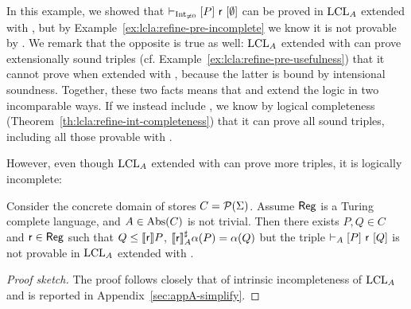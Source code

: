 In this example, we showed that $\vdash_{\text{Int}_{\neq 0}}\nobreak[P]~\mathsf{r}~[\emptyset]$ can be proved in $\text{LCL}_A$ extended with , but by Example~\ref{ex:lcla:refine-pre-incomplete} we know it is not provable by . We remark that the opposite is true as well: $\text{LCL}_A$ extended with  can prove extensionally sound triples (cf. Example~\ref{ex:lcla:refine-pre-usefulness}) that it cannot prove when extended with , because the latter is bound by intensional soundness. Together, these two facts means that  and  extend the logic in two incomparable ways. If we instead include , we know by logical completeness (Theorem~\ref{th:lcla:refine-int-completeness}) that it can prove all sound triples, including all those provable with .

However, even though $\text{LCL}_A$ extended with  can prove more triples, it is logically incomplete:

\begin{theorem}\label{th:lcla:intrinsic-incompl-simplify}
	Consider the concrete domain of stores $C = \mathcal{P}(\Sigma)$. Assume $\mathsf{Reg}$ is a Turing complete language, and $A \in \text{\normalfont Abs}(C)$ is not trivial. Then there exists $P, Q \in C$ and $\mathsf{r} \in \mathsf{Reg}$ such that $Q \le \llbracket\mathsf{r}\rrbracket P$, $\llbracket\mathsf{r}\rrbracket^{\sharp}_A \alpha(P) = \alpha(Q)$ but the triple $\vdash_{A}\nobreak[P]~\mathsf{r}~[Q]$ is not provable in $\text{LCL}_A$ extended with .
\end{theorem}
\begin{proof}[Proof sketch]
	The proof follows closely that of intrinsic incompleteness of $\text{LCL}_A$ \cite[Theorem~5.12]{BGGR21} and is reported in Appendix~\ref{sec:appA-simplify}.
\end{proof}

